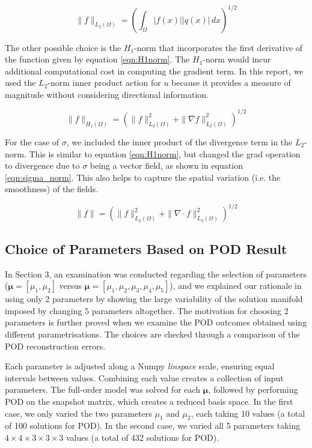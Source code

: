 \begin{equation}
    \| f \|_{L_2(\Omega)} = \left( \int_{\Omega} |f(x)| |q(x)| \, dx \right)^{1/2}
    \label{eqn:L2norm}
\end{equation}

The other possible choice is the $H_1$-norm that incorporates the first derivative of the function given by equation \ref{eqn:H1norm}. The $H_1$-norm would incur additional computational cost in computing the gradient term. In this report, we used the $L_2$-norm inner product action for $u$ because it provides a measure of magnitude without considering directional information. 

\begin{equation}
    \| f \|_{H_1(\Omega)} = \left( \| f \|_{L_2(\Omega)}^2 + \| \nabla f \|_{L_2(\Omega)}^2 \right)^{1/2}
    \label{eqn:H1norm}
\end{equation}

For the case of $\sigma$, we included the inner product of the divergence term in the $L_2$-norm. This is similar to equation \ref{eqn:H1norm}, but changed the grad operation to divergence due to $\sigma$ being a vector field, as shown in equation 
\ref{eqn:sigma_norm}. This also helps to capture the spatial variation (i.e. the smoothness) of the fields. 

\begin{equation}
    \| f \| = \left( \| f \|_{L_2(\Omega)}^2 + \| \nabla \cdot f \|_{L_2(\Omega)}^2 \right)^{1/2}
    \label{eqn:sigma_norm}
\end{equation}

\subsection{Choice of Parameters Based on POD Result}
In Section 3, an examination was conducted regarding the selection of parameters ($\bm{\mu}=[\mu_1, \mu_2]$ versus $\bm{\mu} = [\mu_1, \mu_2, \mu_3, \mu_4, \mu_5]$), and we explained our rationale in using only 2 parameters by showing the large variability of the solution manifold imposed by changing 5 parameters altogether. The motivation for choosing 2 parameters is further proved when we examine the POD outcomes obtained using different parametrisations. The choices are checked through a comparison of the POD reconstruction errors. 

Each parameter is adjusted along a Numpy \textit{linspace} scale, ensuring equal intervals between values. Combining each value creates a collection of input parameters. The full-order model was solved for each $\bm{\mu}$, followed by performing POD on the snapshot matrix, which creates a reduced basis space. In the first case, we only varied the two parameters $\mu_1$ and $\mu_2$, each taking 10 values (a total of 100 solutions for POD). In the second case, we varied all 5 parameters taking $4 \times 4 \times 3 \times 3 \times 3$ values (a total of 432 solutions for POD). 

